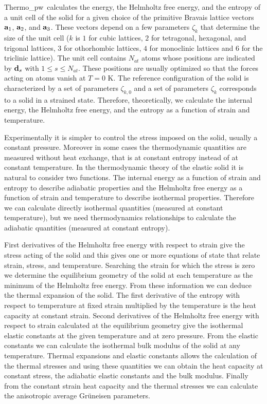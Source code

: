 \documentclass[12pt,a4paper,twoside]{report}
\def\tpw{{\sc Thermo\_pw}}
\begin{document}
\tpw\ calculates the energy, the Helmholtz free energy, and the
entropy of a unit cell of the solid for a given choice of the primitive 
Bravais lattice vectors ${\bf a}_1$, ${\bf a}_2$, and ${\bf a}_3$. These
vectors depend on a few parameters $\zeta_k$ that determine the size 
of the unit cell ($k$ is $1$ for cubic lattices, $2$ for tetragonal, hexagonal,
and trigonal lattices, $3$ for othorhombic lattices, $4$ for monoclinic
lattices and $6$ for the triclinic lattice).
The unit cell contains $N_{at}$ atoms
whose positions are indicated by ${\bf d}_s$ with $1\le s\le N_{at}$.
These positions are usually optimized so that the forces acting on atoms 
vanish at $T=0$ K.
The reference configuration of the solid is
characterized by a set of parameters $\zeta_{k,0}$ and a set of parameters 
$\zeta_k$ corresponds to a solid in a strained state.
Therefore, theoretically, we calculate the 
internal energy, the Helmholtz free energy, and the entropy as a 
function of strain and temperature.

Experimentally it is simpler to control the stress imposed on the solid,
usually a constant pressure.
Moreover in some cases the thermodynamic quantities are measured without 
heat exchange, that is at constant entropy instead of at constant temperature. 
In the thermodynamic theory of the elastic solid it is natural to consider two
functions. The internal energy as a function of strain and entropy  
to describe adiabatic properties and the Helmholtz free energy as a function
of strain and temperature to describe isothermal properties.
Therefore we can calculate directly isothermal quantities (measured at constant
temperature), but we need thermodynamics relationships to calculate
the adiabatic quantities (measured at constant entropy).

First derivatives of the Helmholtz free energy with respect to strain
give the stress acting of the solid and this gives one or more equations
of state that relate strain, stress, and temperature. 
Searching the strain for which the stress is zero we determine the 
equilibrium geometry of the solid at each temperature as the minimum of 
the Helmholtz free energy. From these information we can deduce the
thermal expansion of the solid. The first derivative of the entropy 
with respect to temperature at fixed strain multiplied by the temperature
is the heat capacity at constant strain. Second derivatives of the 
Helmholtz free energy with 
respect to strain calculated at the equilibrium geometry give the 
isothermal elastic constants at the given temperature and at zero pressure. 
From the elastic constants we can calculate the isothermal bulk modulus 
of the solid at any temperature. 
Thermal expansions and elastic constants allows the calculation of the thermal
stresses and using these quantities we can obtain the heat capacity at
constant stress, the adiabatic elastic constants and the bulk modulus.
Finally from the constant strain heat capacity and the thermal stresses 
we can calculate the anisotropic average Gr\"uneisen parameters.
\end{document}
